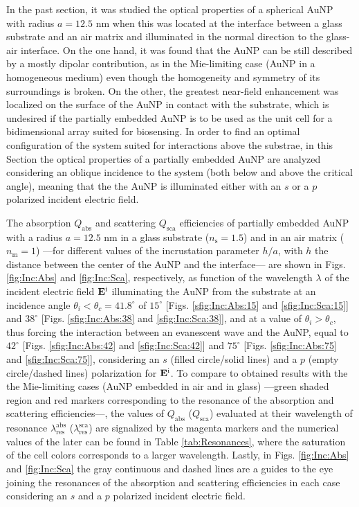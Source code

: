 
In the past section, it was studied the optical properties of a spherical AuNP with radius $a = 12.5$ nm when this was located at the interface between a glass substrate and an air matrix and illuminated in the normal direction to the glass-air interface. On the one hand, it was found that the AuNP can be still described by a mostly dipolar contribution, as in the Mie-limiting case (AuNP in a homogeneous medium) even though the homogeneity and symmetry of its surroundings is broken. On the other, the greatest near-field enhancement was localized on  the surface of the AuNP in contact with the substrate, which is undesired if the partially embedded AuNP is to be used as the unit cell for a bidimensional array suited for biosensing. In order to find an optimal configuration of the system suited for interactions above the substrae, in this Section the optical properties of a partially embedded AuNP are analyzed considering an oblique incidence to the system (both below and above the critical angle), meaning that the the AuNP is illuminated either with an $s$ or a $p$ polarized incident electric field.

The absorption $Q_\text{abs}$ and scattering $Q_\text{sca}$ efficiencies of partially embedded  AuNP with a radius $a =12.5$ nm in a glass substrate ($n_\text{s} = 1.5$) and in an air matrix ($n_\text{m} = 1$) ---for different values of the incrustation parameter $h/a$, with $h$ the distance between the center of the AuNP and the interface--- are shown in Figs. \ref{fig:Inc:Abs} and \ref{fig:Inc:Sca}, respectively, as function of the wavelength $\lambda$ of the incident electric field $\vb{E}^\text{i}$ illuminating the AuNP from the substrate at an incidence angle $\theta_i < \theta_c = 41.8^\circ$ of $15^\circ$ [Figs. \ref{sfig:Inc:Abs:15} and \ref{sfig:Inc:Sca:15}] and  $38^\circ$ [Figs. \ref{sfig:Inc:Abs:38} and \ref{sfig:Inc:Sca:38}], and  at a value of $\theta_i>\theta_c$, thus forcing the interaction between an evanescent wave and the AuNP, equal to $42^\circ$  [Figs. \ref{sfig:Inc:Abs:42} and \ref{sfig:Inc:Sca:42}] and $75^\circ$  [Figs. \ref{sfig:Inc:Abs:75} and \ref{sfig:Inc:Sca:75}], considering an $s$ (filled circle/solid lines) and a $p$ (empty circle/dashed lines) polarization for $\vb{E}^\text{i}$. To compare to obtained results with the the Mie-limiting cases (AuNP embedded in air and in glass) ---green shaded region and red markers corresponding to the resonance of the absorption and scattering efficiencies---, the values of $Q_\text{abs}$ ($Q_\text{sca}$) evaluated at their wavelength of resonance $\lambda_\text{res}^\text{abs}$ ($\lambda_\text{res}^\text{sca}$) are signalized by the magenta markers and the numerical values of the later can be found in Table \ref{tab:Resonances}, where the saturation of the cell colors corresponds to a larger wavelength. Lastly, in Figs. \ref{fig:Inc:Abs} and \ref{fig:Inc:Sca} the gray continuous and dashed lines are a guides to the eye joining the resonances of the absorption and scattering efficiencies in each case considering an $s$ and a $p$ polarized incident electric field.

